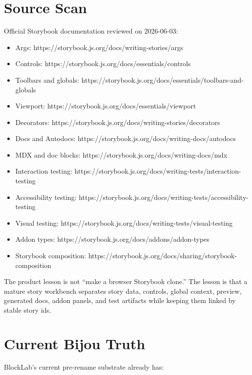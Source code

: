 \section{Source Scan}\label{record-135-source-scan}

Official Storybook documentation reviewed on 2026-06-03:

\begin{itemize}
\tightlist
\item
  Args: https://storybook.js.org/docs/writing-stories/args
\item
  Controls: https://storybook.js.org/docs/essentials/controls
\item
  Toolbars and globals: https://storybook.js.org/docs/essentials/toolbars-and-globals
\item
  Viewport: https://storybook.js.org/docs/essentials/viewport
\item
  Decorators: https://storybook.js.org/docs/writing-stories/decorators
\item
  Docs and Autodocs: https://storybook.js.org/docs/writing-docs/autodocs
\item
  MDX and doc blocks: https://storybook.js.org/docs/writing-docs/mdx
\item
  Interaction testing: https://storybook.js.org/docs/writing-tests/interaction-testing
\item
  Accessibility testing: https://storybook.js.org/docs/writing-tests/accessibility-testing
\item
  Visual testing: https://storybook.js.org/docs/writing-tests/visual-testing
\item
  Addon types: https://storybook.js.org/docs/addons/addon-types
\item
  Storybook composition: https://storybook.js.org/docs/sharing/storybook-composition
\end{itemize}

The product lesson is not ``make a browser Storybook clone.'' The lesson is that a mature story workbench separates story data, controls, global context, preview, generated docs, addon panels, and test artifacts while keeping them linked by stable story ids.

\section{Current Bijou Truth}\label{record-135-current-bijou-truth}

BlockLab's current pre-rename substrate already has:

